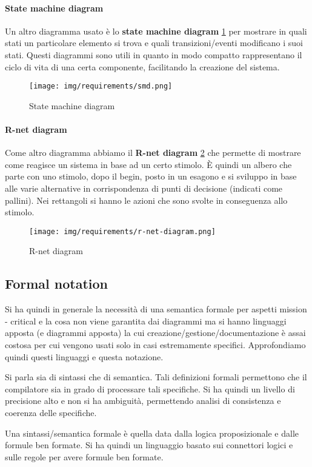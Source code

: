 \paragraph{State machine diagram}
Un altro diagramma usato è lo \textbf{state machine diagram} \ref{fig:smd} per
mostrare in quali stati un particolare elemento si trova e quali transizioni/eventi
modificano i suoi stati. Questi diagrammi sono utili in quanto in modo compatto
rappresentano il ciclo di vita di una certa componente, facilitando la creazione
del sistema.
\begin{figure}[!ht]
      \centering
      \texttt{[image: img/requirements/smd.png]}
      \caption{State machine diagram}
      \label{fig:smd}
\end{figure}
\paragraph{R-net diagram}
Come altro diagramma abbiamo il \textbf{R-net diagram} \ref{fig:r-net-diagram} che permette di mostrare
come reagisce un sistema in base ad un certo stimolo. È quindi un albero che parte
con uno stimolo, dopo il begin, posto in un esagono e si sviluppo in base alle
varie alternative in corrispondenza di punti di decisione (indicati come pallini).
Nei rettangoli si hanno le azioni che sono svolte in conseguenza allo stimolo.
\begin{figure}[!ht]
      \centering
      \texttt{[image: img/requirements/r-net-diagram.png]}
      \caption{R-net diagram}
      \label{fig:r-net-diagram}
\end{figure}
\subsection{Formal notation}
Si ha quindi in generale la necessità di una semantica formale per aspetti
mission - critical e la cosa non viene garantita dai diagrammi ma si hanno linguaggi
apposta (e diagrammi apposta) la cui creazione/gestione/documentazione è assai
costosa per cui vengono usati solo in casi estremamente specifici. Approfondiamo
quindi questi linguaggi e questa notazione.

Si parla sia di sintassi che di semantica. Tali definizioni formali permettono
che il compilatore sia in grado di processare tali specifiche. Si ha quindi un
livello di precisione alto e non si ha ambiguità, permettendo analisi di consistenza
e coerenza delle specifiche.

Una sintassi/semantica formale è quella data dalla logica proposizionale e dalle
formule ben formate. Si ha quindi un linguaggio basato sui connettori logici e
sulle regole per avere formule ben formate.

